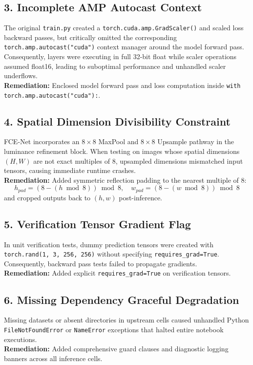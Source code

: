 \documentclass[10pt,twocolumn,letterpaper]{article}
\begin{document}
\subsection{3. Incomplete AMP Autocast Context}
The original \texttt{train.py} created a \texttt{torch.cuda.amp.GradScaler()} and scaled loss backward passes, but critically omitted the corresponding \texttt{torch.amp.autocast("cuda")} context manager around the model forward pass. Consequently, layers were executing in full 32-bit float while scaler operations assumed float16, leading to suboptimal performance and unhandled scaler underflows. \\
\textbf{Remediation:} Enclosed model forward pass and loss computation inside \texttt{with torch.amp.autocast("cuda"):}.

\subsection{4. Spatial Dimension Divisibility Constraint}
FCE-Net incorporates an $8\times8$ MaxPool and $8\times8$ Upsample pathway in the luminance refinement block. When testing on images whose spatial dimensions $(H, W)$ are not exact multiples of 8, upsampled dimensions mismatched input tensors, causing immediate runtime crashes. \\
\textbf{Remediation:} Added symmetric reflection padding to the nearest multiple of 8:
\begin{equation}
h_{pad} = (8 - (h \bmod 8)) \bmod 8, \quad w_{pad} = (8 - (w \bmod 8)) \bmod 8
\end{equation}
and cropped outputs back to $(h, w)$ post-inference.

\subsection{5. Verification Tensor Gradient Flag}
In unit verification tests, dummy prediction tensors were created with \texttt{torch.rand(1, 3, 256, 256)} without specifying \texttt{requires\_grad=True}. Consequently, backward pass tests failed to propagate gradients. \\
\textbf{Remediation:} Added explicit \texttt{requires\_grad=True} on verification tensors.

\subsection{6. Missing Dependency Graceful Degradation}
Missing datasets or absent directories in upstream cells caused unhandled Python \texttt{FileNotFoundError} or \texttt{NameError} exceptions that halted entire notebook executions. \\
\textbf{Remediation:} Added comprehensive guard clauses and diagnostic logging banners across all inference cells.
\end{document}
